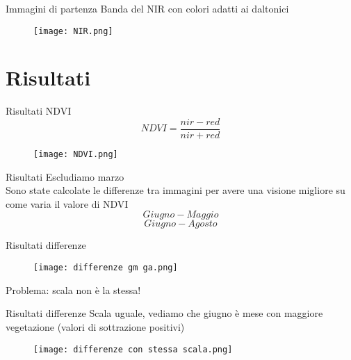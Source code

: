 \documentclass{beamer} %
\begin{document}
\begin{frame}{Immagini di partenza}
Banda del NIR con colori adatti ai daltonici
	\begin{figure}
		\centering
		\texttt{[image: NIR.png]}
		\label{fig:enter-label}
	\end{figure}
\end{frame}


\section{Risultati}


\begin{frame}{Risultati NDVI}
	\begin{equation}
		{NDVI}= \frac{nir-red}{nir+red}
	\end{equation} 
	\begin{figure}
		\centering
		\texttt{[image: NDVI.png]}
		\label{fig:enter-label}
	\end{figure}
\end{frame}


\begin{frame}{Risultati}
Escludiamo marzo \\
\bigskip
Sono state calcolate le differenze tra immagini per avere una visione migliore su come varia il valore di NDVI 
	\begin{equation}
		Giugno - Maggio
	\end{equation}
	\begin{equation}
		Giugno - Agosto
	\end{equation}
\end{frame}


\begin{frame}{Risultati differenze}
	\begin{figure}
		\centering
		\texttt{[image: differenze gm ga.png]}
		\label{fig:enter-label}
	\end{figure}
\centering
Problema: scala non è la stessa!
\end{frame}


\begin{frame}{Risultati differenze}
Scala uguale, vediamo che giugno è mese con maggiore vegetazione (valori di sottrazione positivi)
	\begin{figure}
		\centering
		\texttt{[image: differenze con stessa scala.png]}
		\label{fig:enter-label}
	\end{figure}
\end{frame}
\end{document}
